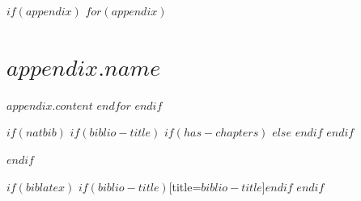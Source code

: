 \documentclass[$if(font_size)$$font_size$$else$12pt$endif$]{book}
\begin{document}
\begin{flushleft}
    \titleformat{\section}[block]{\normalfont\large\bfseries}{}{1em}{}
    \setcounter{table}{0}
    \setcounter{figure}{0}
    $if(appendix)$
    $for(appendix)$
    \newpage
    \section{$appendix.name$}
    $appendix.content$
    $endfor$
    $endif$
\end{flushleft}


\begin{flushleft}
    \titleformat{\section}[block]{\normalfont\large\bfseries}{}{1em}{}
$if(natbib)$
$if(biblio-title)$
$if(has-chapters)$
\renewcommand\bibname{$biblio-title$} %
$else$
\renewcommand\refname{$biblio-title$} %
$endif$
$endif$

$endif$

$if(biblatex)$
\printbibliography$if(biblio-title)$[title=$biblio-title$]$endif$
$endif$
\end{flushleft}
\end{document}
